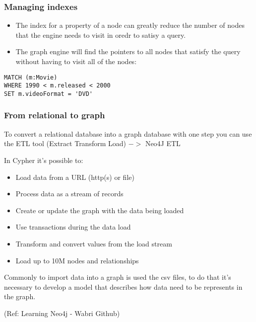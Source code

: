 \begin{frame}[fragile]\frametitle{Managing indexes}
\begin{itemize}
\item The index for a property of a node can greatly reduce the number of nodes that the engine needs to visit in oredr to satisy a query.
\item The graph engine will find the pointers to all nodes that satisfy the query without having to visit all of the nodes:
\end{itemize}


\begin{lstlisting}
MATCH (m:Movie)
WHERE 1990 < m.released < 2000
SET m.videoFormat = 'DVD'
\end{lstlisting}

\end{frame}

\begin{frame}[fragile]\frametitle{From relational to graph}
To convert a relational database into a graph database with one step you can use the ETL tool (Extract Transform Load) $->$ Neo4J ETL

In Cypher it's possible to:

\begin{itemize}
\item Load data from a URL (http(s) or file)
\item Process data as a stream of records
\item Create or update the graph with the data being loaded
\item Use transactions during the data load
\item Transform and convert values from the load stream
\item Load up to 10M nodes and relationships
\end{itemize}

Commonly to import data into a graph is used the csv files, to do that it's necessary to develop a model that describes how data need to be represents in the graph.

{\tiny (Ref: Learning Neo4j - Wabri Github)}

\end{frame}

